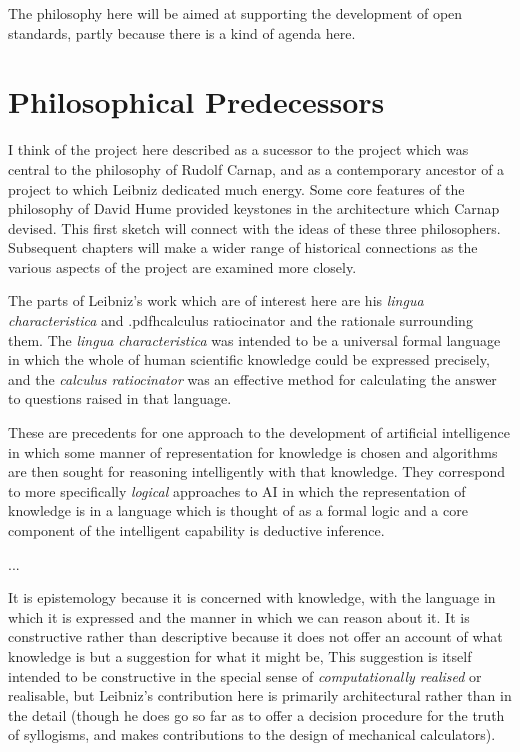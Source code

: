 {The philosophy here will be aimed at supporting the development of open standards,
partly because there is a kind of agenda here.

\section{Philosophical Predecessors}

I think of the project here described as a sucessor to the project which
was central to the philosophy of Rudolf Carnap, and as a contemporary ancestor
of a project to which Leibniz dedicated much energy.
Some core features of the philosophy of David Hume provided keystones in
the architecture which Carnap devised.
This first sketch will connect with the ideas of these three philosophers.
Subsequent chapters will make a wider range of historical connections
as the various aspects of the project are examined more closely.

The parts of Leibniz's work which are of interest here are his
{\it lingua characteristica} and \empftdbook.pdfh{calculus ratiocinator} and the
rationale surrounding them.
The {\it lingua characteristica} was intended to be a universal formal language
in which the whole of human scientific knowledge could be expressed precisely,
and the {\it calculus ratiocinator} was an effective method for calculating
the answer to questions raised in that language.

These are precedents for one approach to the development of artificial intelligence
in which some manner of representation for knowledge is chosen and algorithms
are then sought for reasoning intelligently with that knowledge. 
They correspond to more specifically {\it logical} approaches to AI
in which the representation of knowledge is in a language which is thought
of as a formal logic and a core component of the intelligent capability is
deductive inference.

...

It is epistemology because it is concerned with knowledge, with the language
in which it is expressed and the manner in which we can reason about it.
It is constructive rather than descriptive because it does not offer an account
of what knowledge is but a suggestion for what it might be,
This suggestion is itself intended to be constructive in the special sense
of {\it computationally realised} or realisable, but Leibniz's contribution here is
primarily architectural rather than in the detail (though he does go so far as to
offer a decision procedure for the truth of syllogisms, and makes contributions
to the design of mechanical calculators).

}
